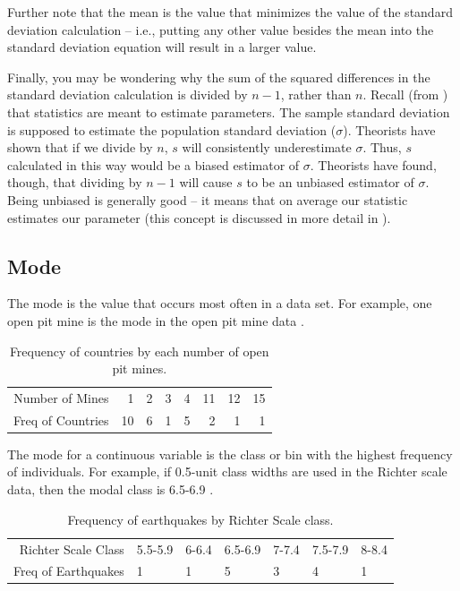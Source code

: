 \documentclass[10pt,openany]{book}\usepackage[]{graphicx}\usepackage[]{color}
\begin{document}

Further note that the mean is the value that minimizes the value of the standard deviation calculation -- i.e., putting any other value besides the mean into the standard deviation equation will result in a larger value.

Finally, you may be wondering why the sum of the squared differences in the standard deviation calculation is divided by $n-1$, rather than $n$. Recall (from ) that statistics are meant to estimate parameters. The sample standard deviation is supposed to estimate the population standard deviation ($\sigma$). Theorists have shown that if we divide by $n$, $s$ will consistently underestimate $\sigma$. Thus, $s$ calculated in this way would be a biased estimator of $\sigma$. Theorists have found, though, that dividing by $n-1$ will cause $s$ to be an unbiased estimator of $\sigma$. Being unbiased is generally good -- it means that on average our statistic estimates our parameter (this concept is discussed in more detail in ).


\subsection{Mode}
The mode is the value that occurs most often in a data set. For example, one open pit mine is the mode in the open pit mine data .

\begin{table}[ht]
\centering
\caption{Frequency of countries by each number of open pit mines.} 
\label{tab:MCmode}
\begin{tabular}{rrrrrrrr}
   \hline
Number of Mines & 1 & 2 & 3 & 4 & 11 & 12 & 15 \\ 
  Freq of Countries & 10 & 6 & 1 & 5 & 2 & 1 & 1 \\ 
   \hline
\end{tabular}
\end{table}


The mode for a continuous variable is the class or bin with the highest frequency of individuals. For example, if 0.5-unit class widths are used in the Richter scale data, then the modal class is 6.5-6.9 .

\begin{table}[ht]
\centering
\caption{Frequency of earthquakes by Richter Scale class.} 
\label{tab:EQmode}
\begin{tabular}{rllllll}
   \hline
Richter Scale Class & 5.5-5.9 & 6-6.4 & 6.5-6.9 & 7-7.4 & 7.5-7.9 & 8-8.4 \\ 
  Freq of Earthquakes & 1 & 1 & 5 & 3 & 4 & 1 \\ 
   \hline
\end{tabular}
\end{table}
\end{document}
